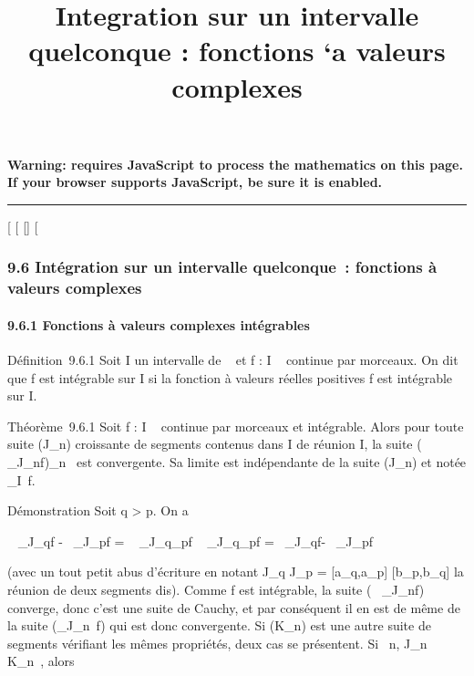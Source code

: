 \documentclass[]{article}
\title{Integration sur un intervalle quelconque : fonctions `a valeurs
complexes}
\author{}
\date{}
\begin{document}
\maketitle

\textbf{Warning: 
requires JavaScript to process the mathematics on this page.\\ If your
browser supports JavaScript, be sure it is enabled.}

\begin{center}\rule{3in}{0.4pt}\end{center}

{[}
{[}
{[}{]}
{[}

\subsubsection{9.6 Intégration sur un intervalle quelconque~: fonctions
à valeurs complexes}

\paragraph{9.6.1 Fonctions à valeurs complexes intégrables}

Définition~9.6.1 Soit I un intervalle de ~ et f : I \rightarrow~  continue par
morceaux. On dit que f est intégrable sur I si la fonction à valeurs
réelles positives \textbar{}f\textbar{} est intégrable sur I.

Théorème~9.6.1 Soit f : I \rightarrow~  continue par morceaux et intégrable. Alors
pour toute suite (J\_n) croissante de segments contenus dans I
de réunion I, la suite (\int ~
\_J\_nf)\_n\in{}~ est convergente. Sa limite est
indépendante de la suite (J\_n) et notée
\int  \_I~f.

Démonstration Soit q \textgreater{} p. On a

\left \textbar{}\int ~
\_J\_qf -\int ~
\_J\_pf\right \textbar{} =
\left \textbar{}\int ~
\_J\_q\diagdownJ\_pf\right
\textbar{}\leq\int ~
\_J\_q\diagdownJ\_p\textbar{}f\textbar{}
=\int ~
\_J\_q\textbar{}f\textbar{}-\int ~
\_J\_p\textbar{}f\textbar{}

(avec un tout petit abus d'écriture en notant J\_q \diagdown
J\_p = {[}a\_q,a\_p{]} \cup
{[}b\_p,b\_q{]} la réunion de deux segments dis\jmathoints ).
Comme \textbar{}f\textbar{} est intégrable, la suite
(\int ~
\_J\_n\textbar{}f\textbar{}) converge, donc c'est une
suite de Cauchy, et par conséquent il en est de même de la suite
(\int  \_J\_n~f) qui est donc
convergente. Si (K\_n) est une autre suite de segments vérifiant
les mêmes propriétés, deux cas se présentent. Si
\forall~n, J\_n \subset~ K\_n~, alors
\end{document}
